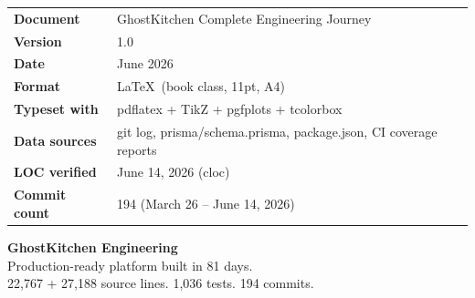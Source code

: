 \documentclass[11pt,a4paper,twoside]{book}
\begin{document}
\begin{center}
\begin{tabular}{p{4cm}p{9cm}}
\toprule
\textbf{Document}      & GhostKitchen Complete Engineering Journey \\
\textbf{Version}       & 1.0 \\
\textbf{Date}          & June 2026 \\
\textbf{Format}        & \LaTeX\ (book class, 11pt, A4) \\
\textbf{Typeset with}  & pdflatex + TikZ + pgfplots + tcolorbox \\
\textbf{Data sources}  & git log, prisma/schema.prisma, package.json, CI coverage reports \\
\textbf{LOC verified}  & June 14, 2026 (cloc) \\
\textbf{Commit count}  & 194 (March 26 – June 14, 2026) \\
\bottomrule
\end{tabular}

\vspace{2cm}

\begin{tcolorbox}[colback=brand!6,colframe=brand,width=12cm]
\centering
\textbf{GhostKitchen Engineering}\\[4pt]
\small Production-ready platform built in 81 days.\\
22,767 + 27,188 source lines. 1,036 tests. 194 commits.
\end{tcolorbox}
\end{center}
\end{document}
